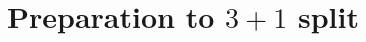 \documentclass[
10pt, %
a4paper, %
oneside, %
headinclude,footinclude, %
BCOR5mm, %
]{scrartcl}
\newcommand{\pd}[1]{\partial_{#1}}
\newcommand{\tetrsymbol}{h}
\newcommand{\tetr}[2]{\tetrsymbol^{#1}_{\phantom{#1}#2}}
\newcommand{\Laghodge}{L}%
\newcommand{\EM}[2]{\Sigma^{#1}_{\phantom{#1}#2}}
\newcommand{\EMmat}[2]{\sigma^{#1}_{\ \,#2}}
\newcommand{\EMgrav}[2]{t^{#1}_{\phantom{#1}#2}}
\newcommand{\HDT}[1]{\accentset{\star}{T}^{#1}}
\newcommand{\Tscal}{\mathcal{T}}		%
\begin{document}
%



\section{Preparation to $ 3+1 $ split}\label{sec.31.prep}
\end{document}
